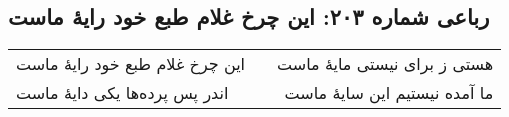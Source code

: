 \begin{center}
\section*{رباعی شماره ۲۰۳: این چرخ غلام طبع خود رایهٔ ماست}
\label{sec:0203}
\begin{longtable}{l p{0.5cm} r}
این چرخ غلام طبع خود رایهٔ ماست
&&
هستی ز برای نیستی مایهٔ ماست
\\
اندر پس پرده‌ها یکی دایهٔ ماست
&&
ما آمده نیستیم این سایهٔ ماست
\\
\end{longtable}
\end{center}
